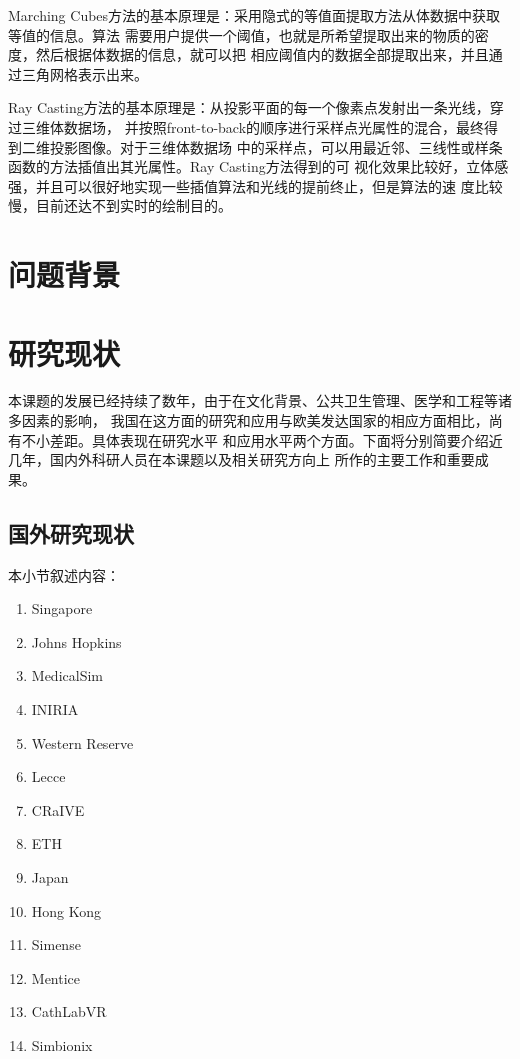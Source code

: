 Marching Cubes方法的基本原理是：采用隐式的等值面提取方法从体数据中获取等值的信息。算法
需要用户提供一个阈值，也就是所希望提取出来的物质的密度，然后根据体数据的信息，就可以把
相应阈值内的数据全部提取出来，并且通过三角网格表示出来。

Ray Casting方法的基本原理是：从投影平面的每一个像素点发射出一条光线，穿过三维体数据场，
并按照front-to-back的顺序进行采样点光属性的混合，最终得到二维投影图像。对于三维体数据场
中的采样点，可以用最近邻、三线性或样条函数的方法插值出其光属性。Ray Casting方法得到的可
视化效果比较好，立体感强，并且可以很好地实现一些插值算法和光线的提前终止，但是算法的速
度比较慢，目前还达不到实时的绘制目的。

\section{问题背景}


\section{研究现状}


本课题的发展已经持续了数年，由于在文化背景、公共卫生管理、医学和工程等诸多因素的影响，
我国在这方面的研究和应用与欧美发达国家的相应方面相比，尚有不小差距。具体表现在研究水平
和应用水平两个方面。下面将分别简要介绍近几年，国内外科研人员在本课题以及相关研究方向上
所作的主要工作和重要成果。

\subsection{国外研究现状}

本小节叙述内容：
\begin{enumerate}
  \item Singapore
  \item Johns Hopkins
  \item MedicalSim
  \item INIRIA
  \item Western Reserve
  \item Lecce
  \item CRaIVE
  \item ETH
  \item Japan
  \item Hong Kong
  \item Simense
  \item Mentice
  \item CathLabVR
  \item Simbionix
\end{enumerate}

